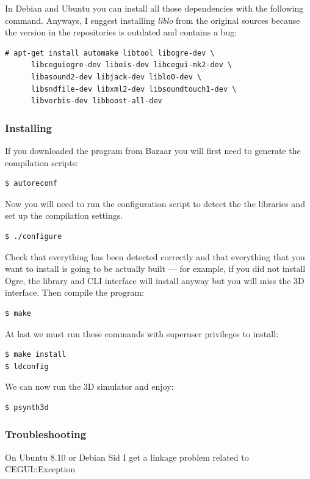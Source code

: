 In Debian and Ubuntu you can install all those dependencies with the
following command. Anyways, I suggest installing \emph{liblo} from the
original sources because the version in the repositories is outdated
and contains a bug:

\begin{verbatim}
# apt-get install automake libtool libogre-dev \
      libceguiogre-dev libois-dev libcegui-mk2-dev \
      libasound2-dev libjack-dev liblo0-dev \ 
      libsndfile-dev libxml2-dev libsoundtouch1-dev \
      libvorbis-dev libboost-all-dev
\end{verbatim}

\subsubsection{Installing}

If you downloaded the program from Bazaar you will first need to
generate the compilation scripts:
\begin{verbatim}
$ autoreconf
\end{verbatim}

Now you will need to run the configuration script to detect the the
libraries and set up the compilation settings.
\begin{verbatim}
$ ./configure
\end{verbatim}

Check that everything has been detected correctly and that everything
that you want to install is going to be actually built --- for
example, if you did not install Ogre, the library and CLI interface
will install anyway but you will miss the 3D interface. Then compile
the program:
\begin{verbatim}
$ make
\end{verbatim}
At last we must run these commands with superuser privileges to install:
\begin{verbatim}
$ make install
$ ldconfig
\end{verbatim}
We can now run the 3D simulator and enjoy:
\begin{verbatim}
$ psynth3d
\end{verbatim}

\subsubsection{Troubleshooting}

\begin{troubleshoot}
  On Ubuntu 8.10 or Debian Sid I get a linkage problem related to
  CEGUI::Exception
\end{troubleshoot}

